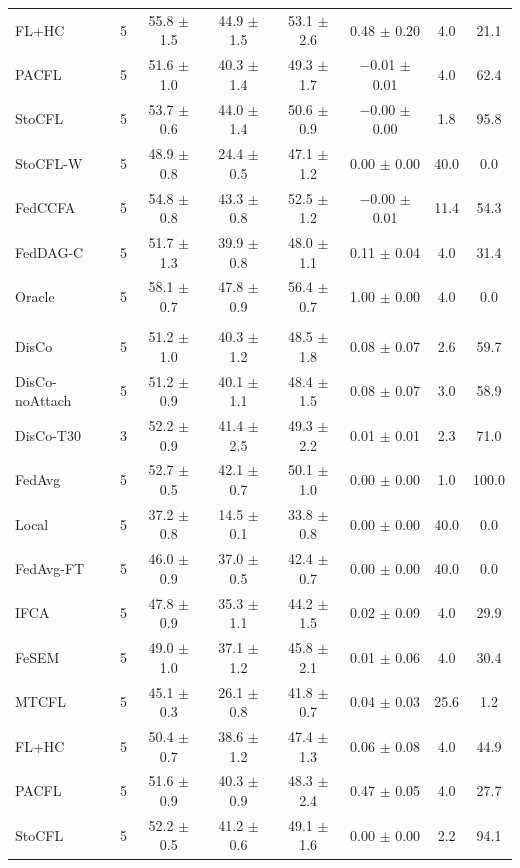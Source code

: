 {\begin{tabular}{l r c c c c c c}
FL+HC & 5 & 55.8 $\pm$ 1.5 & 44.9 $\pm$ 1.5 & 53.1 $\pm$ 2.6 & 0.48 $\pm$ 0.20 & 4.0 & 21.1 \\
PACFL & 5 & 51.6 $\pm$ 1.0 & 40.3 $\pm$ 1.4 & 49.3 $\pm$ 1.7 & $-$0.01 $\pm$ 0.01 & 4.0 & 62.4 \\
StoCFL & 5 & 53.7 $\pm$ 0.6 & 44.0 $\pm$ 1.4 & 50.6 $\pm$ 0.9 & $-$0.00 $\pm$ 0.00 & 1.8 & 95.8 \\
StoCFL-W & 5 & 48.9 $\pm$ 0.8 & 24.4 $\pm$ 0.5 & 47.1 $\pm$ 1.2 & 0.00 $\pm$ 0.00 & 40.0 & 0.0 \\
FedCCFA & 5 & 54.8 $\pm$ 0.8 & 43.3 $\pm$ 0.8 & 52.5 $\pm$ 1.2 & $-$0.00 $\pm$ 0.01 & 11.4 & 54.3 \\
FedDAG-C & 5 & 51.7 $\pm$ 1.3 & 39.9 $\pm$ 0.8 & 48.0 $\pm$ 1.1 & 0.11 $\pm$ 0.04 & 4.0 & 31.4 \\
Oracle & 5 & 58.1 $\pm$ 0.7 & 47.8 $\pm$ 0.9 & 56.4 $\pm$ 0.7 & 1.00 $\pm$ 0.00 & 4.0 & 0.0 \\
\addlinespace
\multicolumn{8}{l}{\textit{CIFAR-100 rotations}} \\
DisCo & 5 & 51.2 $\pm$ 1.0 & 40.3 $\pm$ 1.2 & 48.5 $\pm$ 1.8 & 0.08 $\pm$ 0.07 & 2.6 & 59.7 \\
DisCo-noAttach & 5 & 51.2 $\pm$ 0.9 & 40.1 $\pm$ 1.1 & 48.4 $\pm$ 1.5 & 0.08 $\pm$ 0.07 & 3.0 & 58.9 \\
DisCo-T30 & 3 & 52.2 $\pm$ 0.9 & 41.4 $\pm$ 2.5 & 49.3 $\pm$ 2.2 & 0.01 $\pm$ 0.01 & 2.3 & 71.0 \\
FedAvg & 5 & 52.7 $\pm$ 0.5 & 42.1 $\pm$ 0.7 & 50.1 $\pm$ 1.0 & 0.00 $\pm$ 0.00 & 1.0 & 100.0 \\
Local & 5 & 37.2 $\pm$ 0.8 & 14.5 $\pm$ 0.1 & 33.8 $\pm$ 0.8 & 0.00 $\pm$ 0.00 & 40.0 & 0.0 \\
FedAvg-FT & 5 & 46.0 $\pm$ 0.9 & 37.0 $\pm$ 0.5 & 42.4 $\pm$ 0.7 & 0.00 $\pm$ 0.00 & 40.0 & 0.0 \\
IFCA & 5 & 47.8 $\pm$ 0.9 & 35.3 $\pm$ 1.1 & 44.2 $\pm$ 1.5 & 0.02 $\pm$ 0.09 & 4.0 & 29.9 \\
FeSEM & 5 & 49.0 $\pm$ 1.0 & 37.1 $\pm$ 1.2 & 45.8 $\pm$ 2.1 & 0.01 $\pm$ 0.06 & 4.0 & 30.4 \\
MTCFL & 5 & 45.1 $\pm$ 0.3 & 26.1 $\pm$ 0.8 & 41.8 $\pm$ 0.7 & 0.04 $\pm$ 0.03 & 25.6 & 1.2 \\
FL+HC & 5 & 50.4 $\pm$ 0.7 & 38.6 $\pm$ 1.2 & 47.4 $\pm$ 1.3 & 0.06 $\pm$ 0.08 & 4.0 & 44.9 \\
PACFL & 5 & 51.6 $\pm$ 0.9 & 40.3 $\pm$ 0.9 & 48.3 $\pm$ 2.4 & 0.47 $\pm$ 0.05 & 4.0 & 27.7 \\
StoCFL & 5 & 52.2 $\pm$ 0.5 & 41.2 $\pm$ 0.6 & 49.1 $\pm$ 1.6 & 0.00 $\pm$ 0.00 & 2.2 & 94.1 \\

\end{tabular}}
